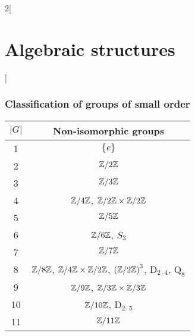 \documentclass[../../../main.tex]{subfiles}
\begin{document}
\begin{multicols}{2}[\section{Algebraic structures}]
  \subsubsection{Classification of groups of small order}
  \begin{center}
    \begin{tabular}{|c|c|}
      \hline
      $|G|$ & Non-isomorphic groups                                                                                                                \\
      \hline
      1     & $\{e\}$                                                                                                                              \\
      \hline
      2     & $\quot{\ZZ}{2\ZZ}$                                                                                                                   \\
      \hline
      3     & $\quot{\ZZ}{3\ZZ}$                                                                                                                   \\
      \hline
      4     & $\quot{\ZZ}{4\ZZ}$, $\quot{\ZZ}{2\ZZ}\times\quot{\ZZ}{2\ZZ}$                                                                         \\
      \hline
      5     & $\quot{\ZZ}{5\ZZ}$                                                                                                                   \\
      \hline
      6     & $\quot{\ZZ}{6\ZZ}$, $S_3$                                                                                                            \\
      \hline
      7     & $\quot{\ZZ}{7\ZZ}$                                                                                                                   \\
      \hline
      8     & $\quot{\ZZ}{8\ZZ}$, $\quot{\ZZ}{4\ZZ}\times\quot{\ZZ}{2\ZZ}$, $\left(\quot{\ZZ}{2\ZZ}\right)^3$, $\text{D}_{2\cdot 4}$, $\text{Q}_8$ \\
      \hline
      9     & $\quot{\ZZ}{9\ZZ}$, $\quot{\ZZ}{3\ZZ}\times\quot{\ZZ}{3\ZZ}$                                                                         \\
      \hline
      10    & $\quot{\ZZ}{10\ZZ}$, $\text{D}_{2\cdot 5}$                                                                                           \\
      \hline
      11    & $\quot{\ZZ}{11\ZZ}$                                                                                                                  \\

\end{tabular}
\end{center}
\end{multicols}
\end{document}
